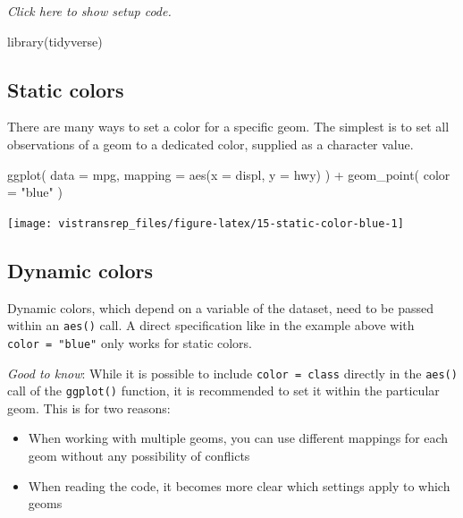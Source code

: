 \documentclass[]{book}
\newenvironment{Shaded}{}{}
\newcommand{\DataTypeTok}[1]{#1}
\newcommand{\KeywordTok}[1]{\textcolor[rgb]{0.00,0.00,1.00}{#1}}
\newcommand{\NormalTok}[1]{#1}
\newcommand{\OperatorTok}[1]{#1}
\newcommand{\StringTok}[1]{\textcolor[rgb]{0.00,0.50,0.50}{#1}}
\providecommand{\tightlist}{%
  \setlength{\itemsep}{0pt}\setlength{\parskip}{0pt}}
\begin{document}
\emph{Click here to show setup code.}

\begin{Shaded}
\begin{Highlighting}[]
\KeywordTok{library}\NormalTok{(tidyverse)}
\end{Highlighting}
\end{Shaded}

\hypertarget{static-colors}{%
\subsection{Static colors}\label{static-colors}}

There are many ways to set a color for a specific geom.
The simplest is to set all observations of a geom to a dedicated color, supplied as a character value.

\begin{Shaded}
\begin{Highlighting}[]
\KeywordTok{ggplot}\NormalTok{(}
  \DataTypeTok{data =}\NormalTok{ mpg,}
  \DataTypeTok{mapping =} \KeywordTok{aes}\NormalTok{(}\DataTypeTok{x =}\NormalTok{ displ, }\DataTypeTok{y =}\NormalTok{ hwy)}
\NormalTok{) }\OperatorTok{+}
\StringTok{  }\KeywordTok{geom_point}\NormalTok{(}
    \DataTypeTok{color =} \StringTok{"blue"}
\NormalTok{  )}
\end{Highlighting}
\end{Shaded}

\begin{flushright}\texttt{[image: vistransrep\_files/figure-latex/15-static-color-blue-1]} \end{flushright}

\hypertarget{dynamic-colors}{%
\subsection{Dynamic colors}\label{dynamic-colors}}

Dynamic colors, which depend on a variable of the dataset, need to be passed within an \texttt{aes()} call.
A direct specification like in the example above with \texttt{color\ =\ "blue"} only works for static colors.

\emph{Good to know}: While it is possible to include \texttt{color\ =\ class} directly in the \texttt{aes()} call of the \texttt{ggplot()} function, it is recommended to set it within the particular geom.
This is for two reasons:

\begin{itemize}
\tightlist
\item
  When working with multiple geoms, you can use different mappings for each geom without any possibility of conflicts
\item
  When reading the code, it becomes more clear which settings apply to which geoms
\end{itemize}
\end{document}

